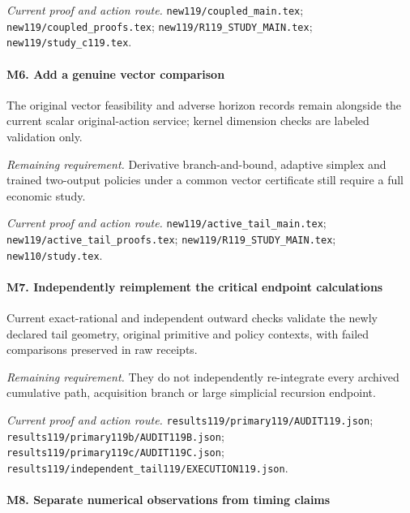 \par\emph{Current proof and action route.} \nolinkurl{new119/coupled_main.tex}; \nolinkurl{new119/coupled_proofs.tex}; \nolinkurl{new119/R119_STUDY_MAIN.tex}; \nolinkurl{new119/study_c119.tex}.

\paragraph{M6. Add a genuine vector comparison}

The original vector feasibility and adverse horizon records remain alongside the current scalar original-action service; kernel dimension checks are labeled validation only.

\par\emph{Remaining requirement.} Derivative branch-and-bound, adaptive simplex and trained two-output policies under a common vector certificate still require a full economic study.

\par\emph{Current proof and action route.} \nolinkurl{new119/active_tail_main.tex}; \nolinkurl{new119/active_tail_proofs.tex}; \nolinkurl{new119/R119_STUDY_MAIN.tex}; \nolinkurl{new110/study.tex}.

\paragraph{M7. Independently reimplement the critical endpoint calculations}

Current exact-rational and independent outward checks validate the newly declared tail geometry, original primitive and policy contexts, with failed comparisons preserved in raw receipts.

\par\emph{Remaining requirement.} They do not independently re-integrate every archived cumulative path, acquisition branch or large simplicial recursion endpoint.

\par\emph{Current proof and action route.} \nolinkurl{results119/primary119/AUDIT119.json}; \nolinkurl{results119/primary119b/AUDIT119B.json}; \nolinkurl{results119/primary119c/AUDIT119C.json}; \nolinkurl{results119/independent_tail119/EXECUTION119.json}.

\paragraph{M8. Separate numerical observations from timing claims}


